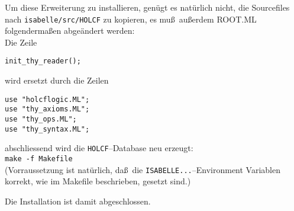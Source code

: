 
Um diese Erweiterung zu installieren, gen\"ugt es nat\"urlich nicht, die
Sourcefiles nach {\tt isabelle/src/HOLCF} zu kopieren, 
es mu\ss\ au\ss erdem ROOT.ML
folgenderma\ss en abge\"andert werden:\\
Die Zeile 
\begin{verbatim}
init_thy_reader();
\end{verbatim}
wird ersetzt durch die Zeilen 
\begin{verbatim}
use "holcflogic.ML";
use "thy_axioms.ML";
use "thy_ops.ML";
use "thy_syntax.ML";
\end{verbatim}
abschliessend wird die {\tt HOLCF}--Database neu erzeugt:\\
{\tt make -f Makefile}\\
(Vorraussetzung ist nat\"urlich, da\ss\ die {\tt ISABELLE...}--Environment
Variablen korrekt, wie im Makefile beschrieben, gesetzt sind.)

Die Installation ist damit abgeschlossen.


 